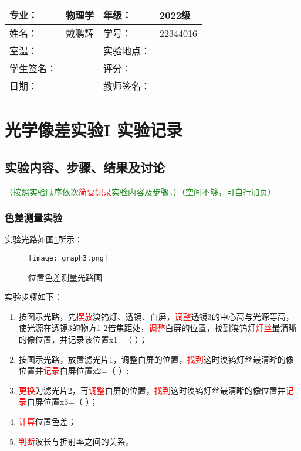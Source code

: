\documentclass[dvipsnames, svgnames,a4paper,11pt]{article}
\begin{document}
\clearpage
\begin{table}
	\renewcommand\arraystretch{1.7}
	\centering
	\begin{tabularx}{\textwidth}{|X|X|X|X|}
	\hline
	专业：& 物理学 &年级：& 2022级 \\
	\hline
	姓名：& 戴鹏辉 & 学号：& 22344016 \\
	\hline
	室温：&  & 实验地点： &  \\
	\hline
	学生签名：& & 评分： &\\
	\hline
	日期：&  & 教师签名：&\\
	\hline
	\end{tabularx}
\end{table}

\section{光学像差实验I \quad\heiti 实验记录}
\subsection{实验内容、步骤、结果及讨论}\textcolor{ForestGreen}{（按照实验顺序依次}\textcolor{red}{简要记录}\textcolor{ForestGreen}{实验内容及步骤，）（空间不够，可自行加页）}

\subsubsection{色差测量实验}
	实验光路如图\ref{fig:graph3}所示：	
		\begin{figure}[htbp]
			\centering
			\texttt{[image: graph3.png]}
			\caption{位置色差测量光路图}
			\label{fig:graph3}
		\end{figure}

	实验步骤如下：
	\begin{enumerate}
		\item 按图示光路，先\textcolor{red}{摆放}溴钨灯、透镜、白屏，\textcolor{red}{调整}透镜3的中心高与光源等高，使光源在透镜3的物方1-2倍焦距处，\textcolor{red}{调整}白屏的位置，找到溴钨灯\textcolor{red}{灯丝}最清晰的像位置，并记录该位置x1=（     ）；
		\item 按图示光路，放置滤光片1，调整白屏的位置，\textcolor{red}{找到}这时溴钨灯丝最清晰的像位置并\textcolor{red}{记录}白屏位置x2=（     ）;
		\item \textcolor{red}{更换}为滤光片2，再\textcolor{red}{调整}白屏的位置，\textcolor{red}{找到}这时溴钨灯丝最清晰的像位置并\textcolor{red}{记录}白屏位置x3=（     ）；
		\item \textcolor{red}{计算}位置色差；
		\item \textcolor{red}{判断}波长与折射率之间的关系。
		
	\end{enumerate}
\end{document}
